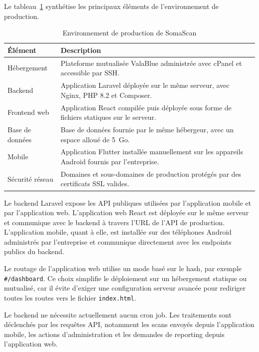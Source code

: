 Le tableau~\ref{tab:environnement-production} synthétise les principaux éléments de l'environnement de production.

\begin{table}[H]
\centering
\begin{tabularx}{\textwidth}{|p{4.2cm}|X|}
\hline
\textbf{Élément} & \textbf{Description} \\
\hline
Hébergement & Plateforme mutualisée ValaBlue administrée avec cPanel et accessible par SSH. \\
\hline
Backend & Application Laravel déployée sur le même serveur, avec Nginx, PHP 8.2 et Composer. \\
\hline
Frontend web & Application React compilée puis déployée sous forme de fichiers statiques sur le serveur. \\
\hline
Base de données & Base de données fournie par le même hébergeur, avec un espace alloué de 5~Go. \\
\hline
Mobile & Application Flutter installée manuellement sur les appareils Android fournis par l'entreprise. \\
\hline
Sécurité réseau & Domaines et sous-domaines de production protégés par des certificats SSL valides. \\
\hline
\end{tabularx}
\caption{Environnement de production de SomaScan}
\label{tab:environnement-production}
\end{table}

Le backend Laravel expose les API publiques utilisées par l'application mobile et par l'application web. L'application web React est déployée sur le même serveur et communique avec le backend à travers l'URL de l'API de production. L'application mobile, quant à elle, est installée sur des téléphones Android administrés par l'entreprise et communique directement avec les endpoints publics du backend.

Le routage de l'application web utilise un mode basé sur le hash, par exemple \texttt{\#/dashboard}. Ce choix simplifie le déploiement sur un hébergement statique ou mutualisé, car il évite d'exiger une configuration serveur avancée pour rediriger toutes les routes vers le fichier \texttt{index.html}.

Le backend ne nécessite actuellement aucun cron job. Les traitements sont déclenchés par les requêtes API, notamment les scans envoyés depuis l'application mobile, les actions d'administration et les demandes de reporting depuis l'application web.

